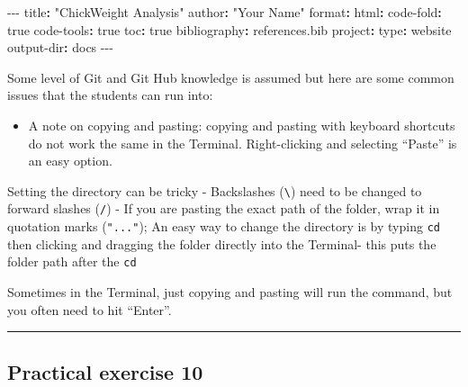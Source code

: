 \documentclass[
  letterpaper,
  DIV=11,
  numbers=noendperiod]{scrartcl}
\newenvironment{Shaded}{\begin{snugshade}}{\end{snugshade}}
\newcommand{\AttributeTok}[1]{\textcolor[rgb]{0.40,0.45,0.13}{#1}}
\newcommand{\CharTok}[1]{\textcolor[rgb]{0.13,0.47,0.30}{#1}}
\newcommand{\FunctionTok}[1]{\textcolor[rgb]{0.28,0.35,0.67}{#1}}
\newcommand{\KeywordTok}[1]{\textcolor[rgb]{0.00,0.23,0.31}{\textbf{#1}}}
\newcommand{\PreprocessorTok}[1]{\textcolor[rgb]{0.68,0.00,0.00}{#1}}
\newcommand{\StringTok}[1]{\textcolor[rgb]{0.13,0.47,0.30}{#1}}
\providecommand{\tightlist}{%
  \setlength{\itemsep}{0pt}\setlength{\parskip}{0pt}}
\begin{document}
\begin{Shaded}
\begin{Highlighting}[]
\PreprocessorTok{{-}{-}{-}}
\FunctionTok{title}\KeywordTok{:}\AttributeTok{ }\StringTok{"ChickWeight Analysis"}
\FunctionTok{author}\KeywordTok{:}\AttributeTok{ }\StringTok{"Your Name"}
\FunctionTok{format}\KeywordTok{:}
\AttributeTok{  }\FunctionTok{html}\KeywordTok{:}
\AttributeTok{    }\FunctionTok{code{-}fold}\KeywordTok{:}\AttributeTok{ }\CharTok{true}
\AttributeTok{    }\FunctionTok{code{-}tools}\KeywordTok{:}\AttributeTok{ }\CharTok{true}
\AttributeTok{    }\FunctionTok{toc}\KeywordTok{:}\AttributeTok{ }\CharTok{true}
\FunctionTok{bibliography}\KeywordTok{:}\AttributeTok{ references.bib}
\FunctionTok{project}\KeywordTok{:}
\AttributeTok{  }\FunctionTok{type}\KeywordTok{:}\AttributeTok{ website}
\AttributeTok{  }\FunctionTok{output{-}dir}\KeywordTok{:}\AttributeTok{ docs}
\PreprocessorTok{{-}{-}{-}}
\end{Highlighting}
\end{Shaded}

Some level of Git and Git Hub knowledge is assumed but here are some
common issues that the students can run into:

\begin{itemize}
\tightlist
\item
  A note on copying and pasting: copying and pasting with keyboard
  shortcuts do not work the same in the Terminal. Right-clicking and
  selecting ``Paste'' is an easy option.
\end{itemize}

Setting the directory can be tricky - Backslashes
(\texttt{\textbackslash{}}) need to be changed to forward slashes
(\texttt{/}) - If you are pasting the exact path of the folder, wrap it
in quotation marks (\texttt{"..."}); An easy way to change the directory
is by typing \texttt{cd} then clicking and dragging the folder directly
into the Terminal- this puts the folder path after the \texttt{cd}

Sometimes in the Terminal, just copying and pasting will run the
command, but you often need to hit ``Enter''.

\begin{center}\rule{0.5\linewidth}{0.5pt}\end{center}

\subsection{Practical exercise 10}\label{practical-exercise-10-1}
\end{document}
